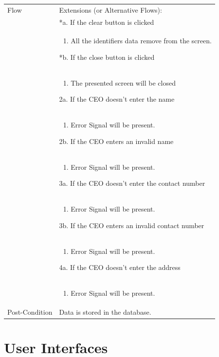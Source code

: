 \documentclass[12pt,a4paper]{report}
\begin{document}
\begin{tabular}{ | m{3cm} | m{12cm}| } \hline
Flow & 
Extensions (or Alternative Flows):\\
& *a. If the clear button is clicked \\
& \begin{enumerate}
		\item All the identifiers data remove from the screen.
	\end{enumerate}
*b. If the close button is clicked\\
&	\begin{enumerate}
		\item The presented screen will be closed
	\end{enumerate}

2a.  If the CEO doesn't enter the name\\ 	
&	\begin{enumerate}
		\item Error Signal will be present.
	\end{enumerate}
2b. If the CEO enters an invalid name \\ 	
&	\begin{enumerate}
		\item Error Signal will be present.
	\end{enumerate}
3a.  If the CEO doesn't enter the contact number\\ 	
&	\begin{enumerate}
		\item Error Signal will be present.
	\end{enumerate}
3b. If the CEO enters an invalid contact number\\ 	
&	\begin{enumerate}
		\item Error Signal will be present.
	\end{enumerate}
4a.  If the CEO doesn't enter the address\\ 	
&	\begin{enumerate}
		\item Error Signal will be present.
	\end{enumerate}
\\ \hline
Post-Condition &  Data is stored in the database. \\\hline
\end{tabular}

\newpage
\chapter {User Interfaces}
\end{document}
